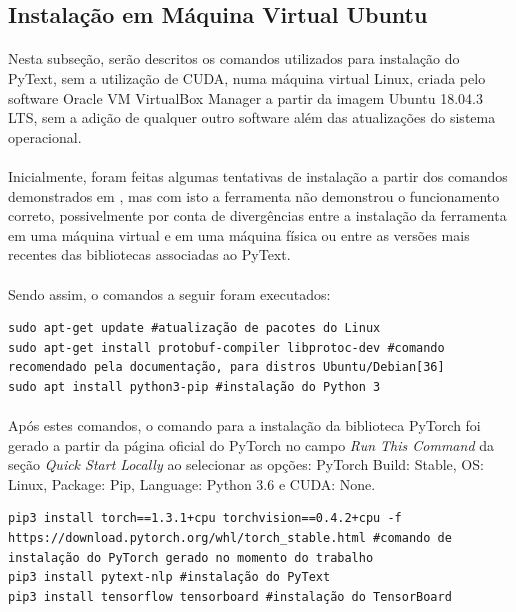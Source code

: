 \documentclass[grad,numbers]{coppe}
\begin{document}
  	\subsection{Instalação em Máquina Virtual Ubuntu}
  		\paragraph{}Nesta subseção, serão descritos os comandos utilizados para instalação do PyText, sem a utilização de CUDA, numa máquina virtual Linux, criada pelo software Oracle VM VirtualBox Manager a partir da imagem Ubuntu 18.04.3 LTS, sem a adição de qualquer outro software além das atualizações do sistema operacional.
  		\paragraph{}Inicialmente, foram feitas algumas tentativas de instalação a partir dos comandos demonstrados em \cite{vinicius-pytext}, mas com isto a ferramenta não demonstrou o funcionamento correto, possivelmente por conta de divergências entre a instalação da ferramenta em uma máquina virtual e em uma máquina física ou entre as versões mais recentes das bibliotecas associadas ao PyText.
  		\paragraph{}Sendo assim, o comandos a seguir foram executados:
			\begin{verbatim}
sudo apt-get update #atualização de pacotes do Linux
sudo apt-get install protobuf-compiler libprotoc-dev #comando recomendado pela documentação, para distros Ubuntu/Debian[36]
sudo apt install python3-pip #instalação do Python 3
  		\end{verbatim}
  		\paragraph{}Após estes comandos, o comando para a instalação da biblioteca PyTorch foi gerado a partir da página oficial do PyTorch\cite{pytorch-page} no campo \textit{Run This Command} da seção \textit{Quick Start Locally} ao selecionar as opções: PyTorch Build: Stable, OS: Linux, Package: Pip, Language: Python 3.6 e CUDA: None.
			\begin{verbatim}
pip3 install torch==1.3.1+cpu torchvision==0.4.2+cpu -f https://download.pytorch.org/whl/torch_stable.html #comando de instalação do PyTorch gerado no momento do trabalho
pip3 install pytext-nlp #instalação do PyText
pip3 install tensorflow tensorboard #instalação do TensorBoard
			\end{verbatim}
\end{document}
